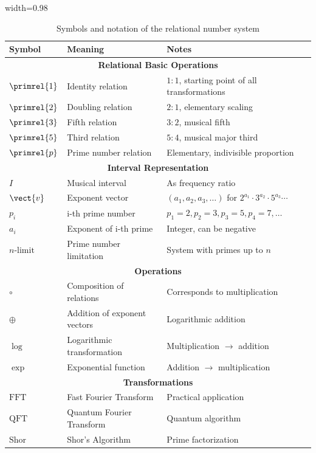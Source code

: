 	{\small
		\begin{table}[htbp]
			\centering
			\begin{adjustbox}{width=0.98\textwidth}
				\begin{tabular}{lll}
					\toprule
					\textbf{Symbol} & \textbf{Meaning} & \textbf{Notes} \\
					\midrule
					\multicolumn{3}{c}{\textbf{Relational Basic Operations}} \\
					$\primrel{1}$ & Identity relation & $1:1$, starting point of all transformations \\
					$\primrel{2}$ & Doubling relation & $2:1$, elementary scaling \\
					$\primrel{3}$ & Fifth relation & $3:2$, musical fifth \\
					$\primrel{5}$ & Third relation & $5:4$, musical major third \\
					$\primrel{p}$ & Prime number relation & Elementary, indivisible proportion \\
					\midrule
					\multicolumn{3}{c}{\textbf{Interval Representation}} \\
					$I$ & Musical interval & As frequency ratio \\
					$\vect{v}$ & Exponent vector & $(a_1, a_2, a_3, \ldots)$ for $2^{a_1} \cdot 3^{a_2} \cdot 5^{a_3} \cdots$ \\
					$p_i$ & i-th prime number & $p_1=2, p_2=3, p_3=5, p_4=7, \ldots$ \\
					$a_i$ & Exponent of i-th prime & Integer, can be negative \\
					$n\text{-limit}$ & Prime number limitation & System with primes up to $n$ \\
					\midrule
					\multicolumn{3}{c}{\textbf{Operations}} \\
					$\circ$ & Composition of relations & Corresponds to multiplication \\
					$\oplus$ & Addition of exponent vectors & Logarithmic addition \\
					$\log$ & Logarithmic transformation & Multiplication $\to$ addition \\
					$\exp$ & Exponential function & Addition $\to$ multiplication \\
					\midrule
					\multicolumn{3}{c}{\textbf{Transformations}} \\
					$\text{FFT}$ & Fast Fourier Transform & Practical application \\
					$\text{QFT}$ & Quantum Fourier Transform & Quantum algorithm \\
					$\text{Shor}$ & Shor's Algorithm & Prime factorization \\
					\bottomrule
				\end{tabular}
			\end{adjustbox}
			\caption{Symbols and notation of the relational number system}
			\label{tab:symbole}
		\end{table}
	}
	
